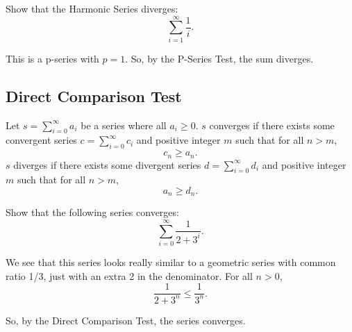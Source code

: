 \begin{example}
	Show that the Harmonic Series diverges:
	\begin{equation*}
		\sum_{i=1}^{\infty}{\frac{1}{i}}.
	\end{equation*}
\end{example}
\begin{answer}
	
	This is a p-series with $p=1$.
	So, by the P-Series Test, the sum diverges.
\end{answer}

\subsection{Direct Comparison Test}
\begin{lemma}
	Let $s = \sum_{i=0}^{\infty}{a_i}$ be a series where all $a_i \geq 0$.
	$s$ converges if there exists some convergent series $c = \sum_{i=0}^{\infty}{c_i}$ and positive integer $m$ such that for all $n > m$,
	\begin{equation*}
		c_n \geq a_n.
	\end{equation*}
	$s$ diverges if there exists some divergent series $d = \sum_{i=0}^{\infty}{d_i}$ and positive integer $m$ such that for all $n > m$,
	\begin{equation*}
		a_n \geq d_n.
	\end{equation*}
\end{lemma}

\begin{example}
	Show that the following series converges:
	\begin{equation*}
		\sum_{i=0}^{\infty}{\frac{1}{2 + 3^i}}.
	\end{equation*}
\end{example}
\begin{answer}
We see that this series looks really similar to a geometric series with common ratio 1/3, just with an extra 2 in the denominator.
For all $n > 0$,
\begin{equation*}
	\frac{1}{2+3^n} \leq \frac{1}{3^n}.
\end{equation*}

So, by the Direct Comparison Test, the series converges.
\end{answer}

